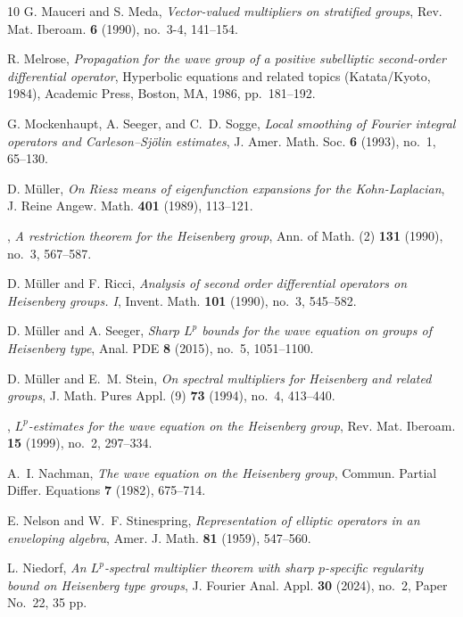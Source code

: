 \documentclass[leqno]{amsart}
\theoremstyle{definition}
\theoremstyle{remark}
\numberwithin{equation}{section}
\begin{document}
\begin{thebibliography}{10}
G. Mauceri and S. Meda, \emph{Vector-valued multipliers on
  stratified groups}, Rev. Mat. Iberoam. \textbf{6} (1990), no.~3-4,
  141--154. 

R. Melrose, \emph{Propagation for the wave group of a positive subelliptic
  second-order differential operator}, Hyperbolic equations and related topics
  ({K}atata/{K}yoto, 1984), Academic Press, Boston, MA, 1986, pp.~181--192.
  
G. Mockenhaupt, A. Seeger, and C.~D. Sogge, \emph{Local smoothing of
  Fourier integral operators and Carleson--Sjölin estimates},
  J. Amer. Math. Soc. \textbf{6} (1993), no.~1, 65--130.

D. Müller, \emph{On {R}iesz means of eigenfunction expansions for the
  {K}ohn-{L}aplacian}, J. Reine Angew. Math. \textbf{401} (1989), 113--121.

\bysame, \emph{A restriction theorem for the {H}eisenberg group},
  Ann. of Math. (2) \textbf{131} (1990), no.~3, 567--587. 

D. Müller and F. Ricci, \emph{Analysis of second order differential operators
  on {H}eisenberg groups. {I}}, Invent. Math. \textbf{101} (1990), no.~3,
  545--582. 

D. Müller and A. Seeger, \emph{Sharp {$L^p$} bounds for the wave
  equation on groups of {H}eisenberg type}, Anal. PDE \textbf{8} (2015),
  no.~5, 1051--1100. 

D. Müller and E.~M. Stein, \emph{On spectral multipliers for
  {H}eisenberg and related groups}, J. Math. Pures Appl. (9) \textbf{73}
  (1994), no.~4, 413--440. 

\bysame, \emph{{$L^p$}-estimates for the wave equation on the {H}eisenberg
  group}, Rev. Mat. Iberoam. \textbf{15} (1999), no.~2, 297--334.

A.~I. Nachman, \emph{The wave equation on the {Heisenberg} group},
  Commun. Partial Differ. Equations \textbf{7} (1982), 675--714.

E. Nelson and W.~F. Stinespring, \emph{Representation of elliptic
  operators in an enveloping algebra}, Amer. J. Math. \textbf{81} (1959),
  547--560. 

L. Niedorf, \emph{An {$L^p$}-spectral multiplier theorem with sharp
  {$p$}-specific regularity bound on {H}eisenberg type groups},
  J. Fourier Anal. Appl. \textbf{30} (2024), no.~2, Paper No.~22, 35 pp.


\end{thebibliography}
\end{document}
